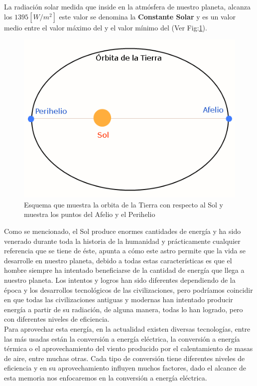 La radiación solar medida que inside en la atmósfera de nuestro planeta, alcanza los $1395 [W/{m}^{2}]$ este valor se denomina la \textbf{Constante Solar} y es un valor medio entre el valor máximo del  y el valor mínimo del  (Ver Fig:\ref{afelioperielio}).\\

\begin{figure}[h!]
        \centering
        \includegraphics[scale=0.5]{images/afelioPerihelio}
        \caption{ Esquema que muestra la orbita de la Tierra con respecto al Sol y muestra los puntos del Afelio y el Perihelio}
	\label{afelioperielio}
\end{figure}

Como se mencionado, el Sol produce enormes cantidades de energía y ha sido venerado durante toda la historia de la humanidad y prácticamente cualquier referencia que se tiene de éste, apunta a cómo este astro permite que la vida se desarrolle en nuestro planeta, debido a todas estas características es que el hombre siempre ha intentado beneficiarse de la cantidad de energía que llega a nuestro planeta. Los intentos y logros han sido diferentes dependiendo de la época y los desarrollos tecnológicos de las civilizaciones, pero podríamos coincidir en que todas las civilizaciones antiguas y modernas han intentado producir energía a partir de su radiación, de alguna manera, todas lo han logrado, pero con diferentes niveles de eficiencia.\\

Para aprovechar esta energía, en la actualidad existen diversas tecnologías, entre las más usadas están la conversión a energía eléctrica, la conversión a energía térmica o el aprovechamiento del viento producido por el calentamiento de masas de aire, entre muchas otras. Cada tipo de conversión tiene diferentes niveles de eficiencia y en su aprovechamiento influyen muchos factores, dado el alcance de esta memoria nos enfocaremos en la conversión a energía eléctrica.\\

